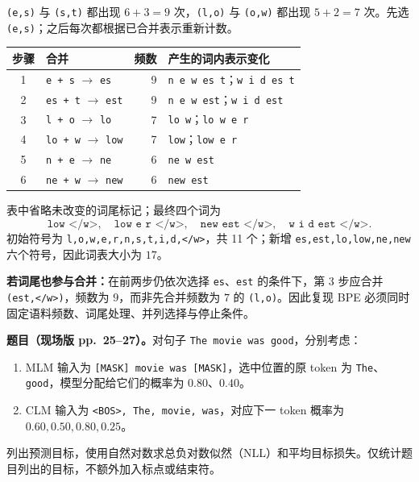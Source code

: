 \begin{workedsolution}
\texttt{(e,s)} 与 \texttt{(s,t)} 都出现 $6+3=9$ 次，\texttt{(l,o)} 与 \texttt{(o,w)} 都出现 $5+2=7$ 次。先选 \texttt{(e,s)}；之后每次都根据已合并表示重新计数。
\begin{center}
\small
\begin{tabular}{@{}clrl@{}}
\toprule
步骤 & 合并 & 频数 & 产生的词内表示变化 \\
\midrule
1 & \texttt{e + s} $\to$ \texttt{es} & 9 & \texttt{n e w es t}；\texttt{w i d es t} \\
2 & \texttt{es + t} $\to$ \texttt{est} & 9 & \texttt{n e w est}；\texttt{w i d est} \\
3 & \texttt{l + o} $\to$ \texttt{lo} & 7 & \texttt{lo w}；\texttt{lo w e r} \\
4 & \texttt{lo + w} $\to$ \texttt{low} & 7 & \texttt{low}；\texttt{low e r} \\
5 & \texttt{n + e} $\to$ \texttt{ne} & 6 & \texttt{ne w est} \\
6 & \texttt{ne + w} $\to$ \texttt{new} & 6 & \texttt{new est} \\
\bottomrule
\end{tabular}
\end{center}
表中省略未改变的词尾标记；最终四个词为
\[
 \texttt{low </w>},\quad \texttt{low e r </w>},\quad
 \texttt{new est </w>},\quad \texttt{w i d est </w>}.
\]
初始符号为 \texttt{l,o,w,e,r,n,s,t,i,d,</w>}，共 11 个；新增 \texttt{es,est,lo,low,ne,new} 六个符号，因此词表大小为 $\boxed{17}$。

\textbf{若词尾也参与合并：}在前两步仍依次选择 \texttt{es}、\texttt{est} 的条件下，第 3 步应合并 \texttt{(est,</w>)}，频数为 $9$，而非先合并频数为 $7$ 的 \texttt{(l,o)}。因此复现 BPE 必须同时固定语料频数、词尾处理、并列选择与停止条件。
\end{workedsolution}

\nopagebreak[4]
\textbf{题目（现场版 pp.~25--27）。}对句子 \texttt{The movie was good}，分别考虑：
\begin{enumerate}
 \item MLM 输入为 \texttt{[MASK] movie was [MASK]}，选中位置的原 token 为 \texttt{The}、\texttt{good}，模型分配给它们的概率为 $0.80$、$0.40$。
 \item CLM 输入为 \texttt{<BOS>, The, movie, was}，对应下一 token 概率为 $0.60,0.50,0.80,0.25$。
\end{enumerate}
列出预测目标，使用自然对数求总负对数似然（NLL）和平均目标损失。仅统计题目列出的目标，不额外加入标点或结束符。

